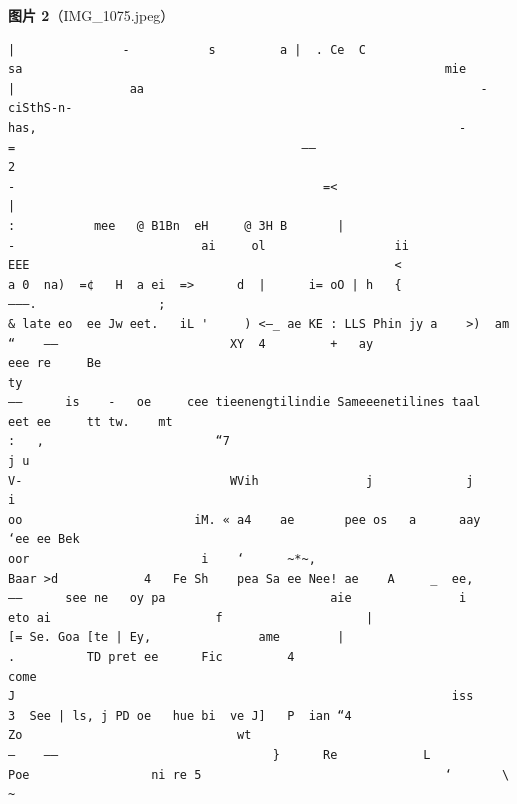 \begin{note}
\textbf{图片 2}（IMG\_1075.jpeg）
\begin{Verbatim}[fontsize=\small]
|               -           s         a |  . Ce  C                                                      sa                                                           mie
|                aa                                               -                       ciSthS-n-
has,                                                           -             =                                        ——
2
-                                           =<                                                                                       |
:           mee   @ B1Bn  eH     @ 3H B       |
-                          ai     ol                  ii
EEE                                                   <
a 0  na)  =¢   H  a ei  =>      d  |      i= oO | h   {                                   ———.                 ;
& late eo  ee Jw eet.   iL '     ) <—_ ae KE : LLS Phin jy a    >)  am   “    ——                        XY  4         +   ay
eee re     Be                                                                                                                                ty
——      is    -   oe     cee tieenengtilindie Sameeenetilines taal  eet ee     tt tw.    mt                                                               :   ,                        “7                                                                                                     j u
V-                             WVih               j             j                                                                                                                    i
oo                        iM. « a4    ae       pee os   a      aay   ‘ee ee Bek                                                                                                           oor                        i    ‘      ~*~,
Baar >d            4   Fe Sh    pea Sa ee Nee! ae    A     _  ee,     ——      see ne   oy pa                       aie               i      eto ai                       f                    |
[= Se. Goa [te | Ey,               ame        |
.          TD pret ee      Fic         4                                                                                          come
J                                                             iss        3  See | ls, j PD oe   hue bi  ve J]   P  ian “4                                                                                                        Zo                              wt
—    ——                              }      Re            L                Poe                 ni re 5                                  ‘       \      ~
\end{Verbatim}


\end{note}
